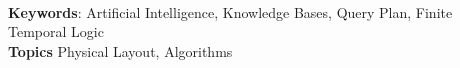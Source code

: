 \documentclass[11pt]{article}
\begin{document}
\begin{abstract}
%
%
%
%
%
%
%
%
%	
\end{abstract}
~\\

{\bf Keywords}: Artificial Intelligence, Knowledge Bases, Query Plan, Finite Temporal Logic
~\\

{\bf Topics} Physical Layout, Algorithms
~\\
\end{document}
